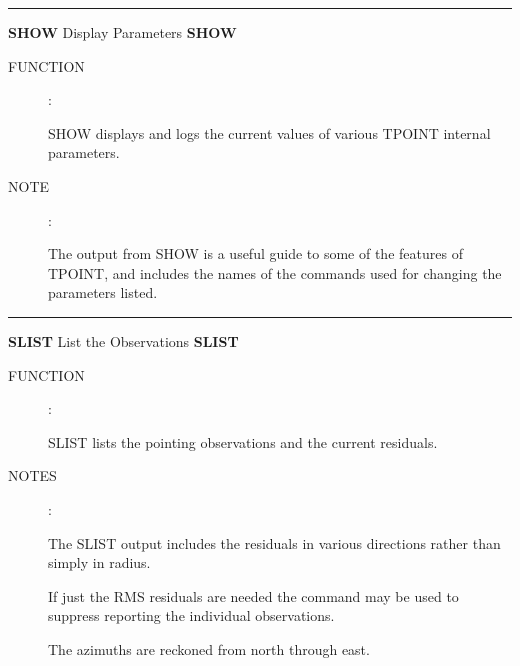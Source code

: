 
\goodbreak
\rule{\textwidth}{0.3mm}
{\Large {\bf SHOW} \hfill Display Parameters \hfill {\bf SHOW}}
\begin{description}
\item [FUNCTION]:

SHOW displays and logs the current values of various TPOINT
internal parameters.

\item [NOTE]:

The output from SHOW is a useful guide to some of the features
of TPOINT, and includes the names of the commands used for changing
the parameters listed.

\end{description}


\goodbreak
\rule{\textwidth}{0.3mm}
{\Large {\bf SLIST} \hfill List the Observations \hfill {\bf SLIST}}
\begin{description}
\item [FUNCTION]:

SLIST lists the pointing observations and the current
residuals.

\item [NOTES]:

The SLIST output includes the residuals in various directions
rather than simply in radius.

If just the RMS residuals are needed the command  may
be used to suppress reporting the individual observations.

The azimuths are reckoned from north through east.

\end{description}


